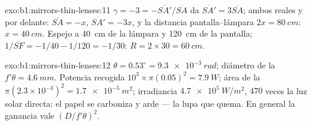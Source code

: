\begin{solution}{exo:b1:mirrors-thin-lenses:11}
$\gamma = -3 = -\overline{SA'}/\overline{SA}$ da $\overline{SA'} =
3\overline{SA}$; ambos reales y por delante: $\overline{SA} = -x$,
$\overline{SA'} = -3x$, y la distancia pantalla--lámpara $2x = \qty{80}{cm}$:
$x = \qty{40}{cm}$. Espejo a \qty{40}{cm} de la lámpara y \qty{120}{cm}
de la pantalla; $1/\overline{SF} = -1/40 - 1/120 = -1/30$:
$R = 2 \times 30 = \qty{60}{cm}$.
\end{solution}

\begin{solution}{exo:b1:mirrors-thin-lenses:12}
$\theta = 0.53^\circ = \qty{9.3e-3}{rad}$; diámetro de la  $f'\theta =
\qty{4.6}{mm}$. Potencia recogida $10^3 \times \pi(0.05)^2 = \qty{7.9}{W}$;
área de la  $\pi(2.3\times10^{-3})^2 = \qty{1.7e-5}{m^2}$; irradiancia
$\qty{4.7e5}{W/m^2}$, $470$ veces la luz solar directa: el papel se
carboniza y arde --- la lupa que quema. En general la ganancia vale
$(D/f'\theta)^2$.
\end{solution}


